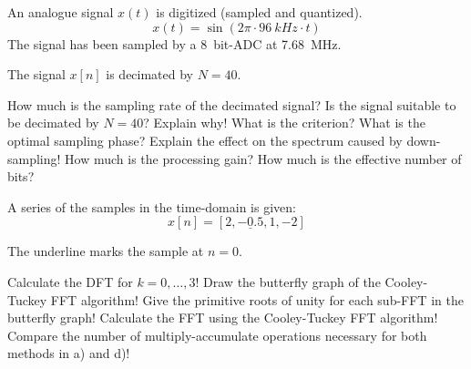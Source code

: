 \begin{question}[subtitle={Down-sampling}]
	An analogue signal $x(t)$ is digitized (sampled and quantized).
	\begin{equation*}
		x(t) = \sin\left(2 \pi \cdot \SI{96}{kHz} \cdot t\right)
	\end{equation*}
	The signal has been sampled by a \SI{8}{bit}-ADC at \SI{7.68}{MHz}.
	
	The signal $x[n]$ is decimated by $N = 40$.
	
	\begin{tasks}
		\task
		How much is the sampling rate of the decimated signal?
		\task
		Is the signal suitable to be decimated by $N = 40$? Explain why! What is the criterion?
		\task
		What is the optimal sampling phase?
		\task
		Explain the effect on the spectrum caused by down-sampling!
		\task
		How much is the processing gain? How much is the effective number of bits?
	\end{tasks}
\end{question}

\begin{solution}
	\begin{tasks}
	\end{tasks}
\end{solution}


\begin{question}[subtitle={FFT}]
	A series of the samples in the time-domain is given:
	\begin{equation*}
		x[n] = \left[2, \underline{-0.5}, 1, -2 \right]
	\end{equation*}
	
	\begin{remark}
		The underline marks the sample at $n = 0$.
	\end{remark}
	
	\begin{tasks}
		\task
		Calculate the DFT for $k = 0, \ldots, 3$!
		\task
		Draw the butterfly graph of the Cooley-Tuckey FFT algorithm!
		\task
		Give the primitive roots of unity for each sub-FFT in the butterfly graph!
		\task
		Calculate the FFT using the Cooley-Tuckey FFT algorithm!
		\task
		Compare the number of multiply-accumulate operations necessary for both methods in a) and d)!
	\end{tasks}
\end{question}


